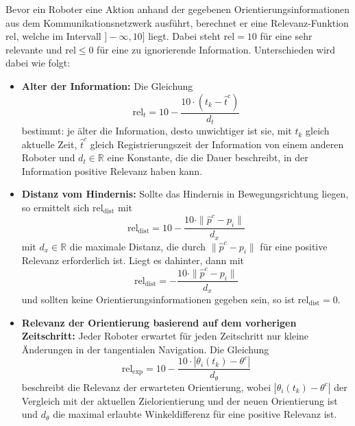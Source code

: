 \documentclass[conference]{IEEEtran}
\begin{document}
Bevor ein Roboter eine Aktion anhand der gegebenen Orientierungsinformationen aus 
dem Kommunikationsnetzwerk ausführt, berechnet er eine Relevanz-Funktion \( \mathrm{rel} \), 
welche im Intervall \( ]-\infty, 10] \) liegt. Dabei steht \( \mathrm{rel}=10 \) für eine 
sehr relevante und \( \mathrm{rel} \leq 0 \) für eine zu ignorierende Information. 
Unterschieden wird dabei wie folgt:
\begin{itemize}
    \item \textbf{Alter der Information:} Die Gleichung
    \begin{equation}
    \mathrm{rel}_t = 10 - \frac{10 \cdot (t_k - \hat{t}^c)}{d_t}
    \end{equation}
    bestimmt: je älter die Information, desto unwichtiger ist sie, mit \( t_k \)
    gleich aktuelle Zeit, \( \hat{t}^c \) gleich Registrierungszeit der Information von einem 
    anderen Roboter und \( d_t \in \mathbb{R} \) eine Konstante, die die Dauer 
    beschreibt, in der Information positive Relevanz haben kann.
    
    \item \textbf{Distanz vom Hindernis:} Sollte das Hindernis in Bewegungsrichtung liegen, 
    so ermittelt sich \( \mathrm{rel}_{\mathrm{dist}} \) mit 
    \begin{equation}
    \mathrm{rel}_{\mathrm{dist}} = 10 - \frac{10 \cdot \| \hat{p}^c - p_i \|}{d_x}
    \end{equation}
    mit \( d_x \in \mathbb{R} \) die maximale Distanz, die durch \( \| \hat{p}^c - p_i \| \) für eine positive 
    Relevanz erforderlich ist. Liegt es dahinter, dann mit
    \begin{equation}
    \mathrm{rel}_{\mathrm{dist}} = - \frac{10 \cdot \| \hat{p}^c - p_i \|}{d_x}
    \end{equation}
    und sollten keine Orientierungsinformationen gegeben sein, so 
    ist \( \mathrm{rel}_{\mathrm{dist}} = 0 \).
    
    \item \textbf{Relevanz der Orientierung basierend auf dem vorherigen Zeitschritt:} Jeder 
    Roboter erwartet für jeden Zeitschritt nur kleine Änderungen in der tangentialen 
    Navigation. Die Gleichung 
    \begin{equation}
    \mathrm{rel}_{\mathrm{exp}} = 10 - \frac{10 \cdot | \theta_i(t_k) - \theta^c |}{d_\theta}
    \end{equation}
    beschreibt die Relevanz der erwarteten Orientierung, wobei 
    \( |\theta_i(t_k) - \theta^c| \) der Vergleich mit der aktuellen Zielorientierung und 
    der neuen Orientierung ist und \( d_\theta \) die maximal erlaubte Winkeldifferenz für 
    eine positive Relevanz ist.
    

\end{itemize}
\end{document}
